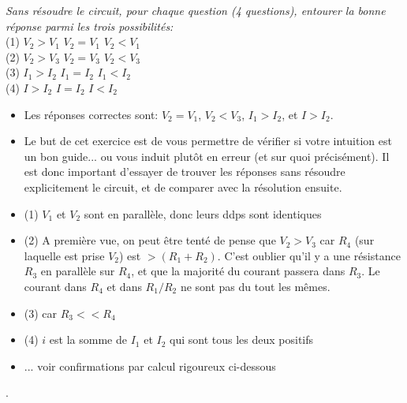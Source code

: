 {
\textit{Sans résoudre le circuit, pour chaque question (4 questions), entourer la bonne réponse parmi les trois possibilités:}\\
(1) \hspace{1cm} $V_2 > V_1$ \hspace{1cm}  $V_2 = V_1$ \hspace{1cm} $V_2 < V_1$\\
(2) \hspace{1cm} $V_2 > V_3$ \hspace{1cm}  $V_2 = V_3$ \hspace{1cm} $V_2 < V_3$\\
(3) \hspace{1cm}  $I_1 > I_2$ \hspace{1.25cm}  $I_1 = I_2$ \hspace{1.25cm} $I_1 < I_2$\\
(4) \hspace{1cm} $I > I_2$ \hspace{1.4cm}  $I = I_2$ \hspace{1.4cm} $I < I_2$\\
}
{%
\begin{itemize}
\item Les réponses correctes sont: \textbf{$V_2 = V_1$}, 
\textbf{$V_2 < V_3$}, \textbf{$I_1 > I_2$}, et 
\textbf{$I > I_2$}.

\item Le but de cet exercice est de vous permettre de vérifier si votre intuition est un bon guide... ou vous induit plutôt en erreur (et sur quoi précisément). Il est donc important d'essayer de trouver les réponses sans résoudre explicitement le circuit, et de comparer avec la résolution ensuite.
\item (1) $V_1$ et $V_2$ sont en parallèle, donc leurs ddps sont identiques
\item (2) A première vue, on peut être tenté de pense que $V_2>V_3$ car $R_4$ (sur laquelle est prise $V_2$) est $>(R_1+R_2)$. C'est oublier qu'il y a une résistance $R_3$ en parallèle sur $R_4$, et que la majorité du courant passera dans $R_3$. Le courant dans $R_4$ et dans $R_1/R_2$ ne sont pas du tout les mêmes.
\item (3) car $R_3<<R_4$
\item (4) $i$ est la somme de $I_1$ et $I_2$ qui sont tous les deux positifs
\item ... voir confirmations par calcul rigoureux ci-dessous
\end{itemize}
.
}

